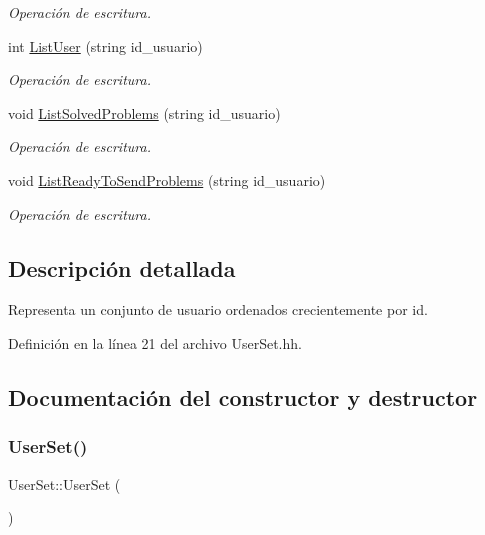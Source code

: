 \begin{DoxyCompactItemize}
\begin{DoxyCompactList}\small\item\em Operación de escritura. \end{DoxyCompactList}\item 
int \mbox{\hyperlink{class_user_set_a2087d9597ff9ce03ff471157040fac88}{List\+User}} (string id\+\_\+usuario)
\begin{DoxyCompactList}\small\item\em Operación de escritura. \end{DoxyCompactList}\item 
void \mbox{\hyperlink{class_user_set_afa40c2da0d1a67c7d7d6750e4e9cd78d}{List\+Solved\+Problems}} (string id\+\_\+usuario)
\begin{DoxyCompactList}\small\item\em Operación de escritura. \end{DoxyCompactList}\item 
void \mbox{\hyperlink{class_user_set_a52e8ebe8033813cf5ad7d8b23d7eea4c}{List\+Ready\+To\+Send\+Problems}} (string id\+\_\+usuario)
\begin{DoxyCompactList}\small\item\em Operación de escritura. \end{DoxyCompactList}\end{DoxyCompactItemize}


\subsection{Descripción detallada}
Representa un conjunto de usuario ordenados crecientemente por id. 

Definición en la línea 21 del archivo User\+Set.\+hh.



\subsection{Documentación del constructor y destructor}
\mbox{\label{class_user_set_a1fcb7215d45571e0f9c4cf4f20b05c80}} 
\subsubsection{\texorpdfstring{User\+Set()}{UserSet()}}
{\footnotesize\ttfamily User\+Set\+::\+User\+Set (\begin{DoxyParamCaption}{ }\end{DoxyParamCaption})}



